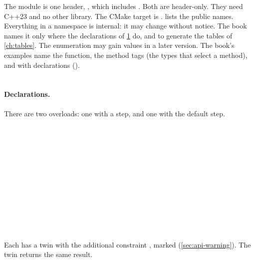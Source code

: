 The module is one header, , which includes . Both are
header-only. They need C++23 and no other library. The CMake target is .
 lists the public names. Everything in a namespace  is internal: it may change
without notice. The book names it only where the declarations of \cref{sec:api-derivative} do, and to generate the
tables of \cref{ch:tables}. The enumeration  may gain values in a later version. The book's examples name
the function, the method tags (the types that select a method),  and  with 
declarations ().

\section{\texorpdfstring{}{derivative}}\label{sec:api-derivative}

\paragraph{Declarations.} There are two overloads: one with a step, and one with the default step.
\begin{signature}
\\
\sigindent{}\\
\sigindent\sigindent{}\\
\sigindent\sigindent{}\\
\\
\sigindent{}\\[1ex]
\\
\sigindent{}\\
\sigindent\sigindent{}\\
\sigindent\sigindent{}\\
\\
\sigindent{}
\end{signature}
Each has a twin with the additional constraint , marked \code{[[deprecated]]}
(\cref{sec:api-warning}). The twin returns the same result.

